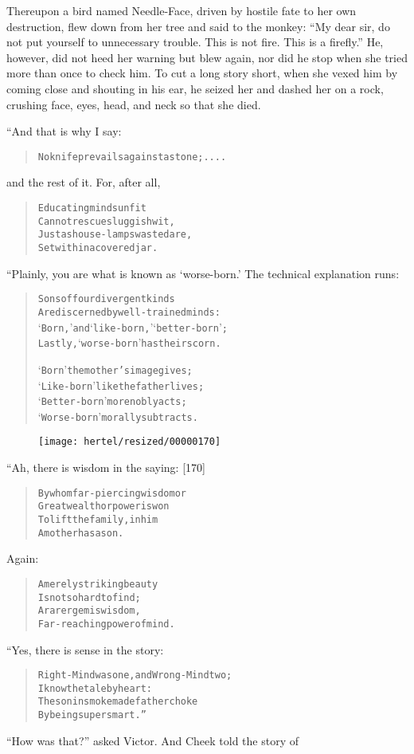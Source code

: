 \documentclass[article, twoside, 10pt]{memoir}
\renewenvironment{verbatim}{%
\begin{quote}%
\vskip -10pt%
\begin{alltt}\normalfont\small}{\end{alltt}%
\end{quote}%
\vskip -10pt
} %
\begin{document}
Thereupon a bird named Needle-Face, driven by hostile fate to her
own destruction, flew down from her tree and said to the monkey:
``My dear sir, do not put yourself to unnecessary trouble. This is not fire. This is a firefly.''
He, however, did not heed her warning but blew again, nor did he
stop when she tried more than once to check him. To cut a long
story short, when she vexed him by coming close and shouting in his
ear, he seized her and dashed her on a rock, crushing face, eyes,
head, and neck so that she died.

“And that is why I say:

\begin{verbatim}
No knife prevails against a stone; ....
\end{verbatim}
and the rest of it. For, after all,

\begin{verbatim}
Educating minds unfit
Cannot rescue sluggish wit,
Just as house-lamps wasted are,
Set within a covered jar.
\end{verbatim}
“Plainly, you are what is known as `worse-born.' The technical
explanation runs:

\begin{verbatim}
Sons of four divergent kinds
Are discerned by well-trained minds:
‘Born,’ and ‘like-born,’ ‘better-born’;
Lastly, ‘worse-born’ has their scorn.

‘Born’ the mother's image gives;
‘Like-born’ like the father lives;
‘Better-born’ more nobly acts;
‘Worse-born’ morally subtracts.
\end{verbatim}
\begin{figure}[p]\texttt{[image: hertel/resized/00000170]}\end{figure}“Ah, there is wisdom in the saying: [170]

\begin{verbatim}
By whom far-piercing wisdom or
    Great wealth or power is won
To lift the family, in him
    A mother has a son.
\end{verbatim}
Again:

\begin{verbatim}
A merely striking beauty
    Is not so hard to find;
A rarer gem is wisdom,
    Far-reaching power of mind.
\end{verbatim}
“Yes, there is sense in the story:

\begin{verbatim}
Right-Mind was one, and Wrong-Mind two;
    I know the tale by heart:
The son in smoke made father choke
    By being supersmart.”
\end{verbatim}
``How was that?'' asked Victor. And Cheek told the story of
\end{document}
